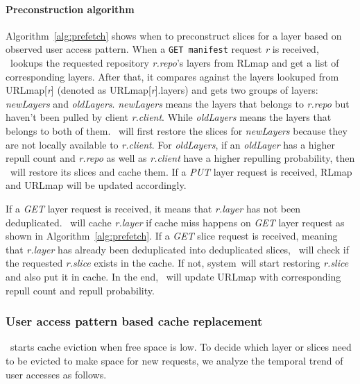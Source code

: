 \paragraph{Preconstruction algorithm}


Algorithm~\ref{alg:prefetch} shows when to preconstruct slices for a layer
based on observed user access pattern.
When a \texttt{GET manifest} request \emph{r} is received,
\preconstructcachename~lookups the requested repository \emph{r.repo}'s layers from RLmap
and get a list of corresponding layers.
After that, it compares against the layers lookuped from URLmap[\emph{r}] (denoted as URLmap[\emph{r}].layers)
and gets two groups of layers: \emph{newLayers} and \emph{oldLayers}.
\emph{newLayers} means the layers that belongs to \emph{r.repo} but haven't been pulled by client \emph{r.client}.
While \emph{oldLayers} means the layers that belongs to both of them.
\preconstructcachename~will first restore the slices for \emph{newLayers} because 
they are not locally available to \emph{r.client}.    
For \emph{oldLayers}, 
if an \emph{oldLayer} has a higher repull count and \emph{r.repo} as well as \emph{r.client} have a higher repulling probability,
then \preconstructcachename~will restore its slices and cache them.
If a \emph{PUT} layer request is received, RLmap and URLmap will be updated accordingly.

If a \emph{GET} layer request is received, it means that \emph{r.layer} has not been deduplicated.
\preconstructcachename~will cache \emph{r.layer} if cache miss happens on \emph{GET} layer request as shown in Algorithm~\ref{alg:prefetch}.
If a \emph{GET} slice request is received, meaning that \emph{r.layer} has already been deduplicated into deduplicated slices,
\preconstructcachename~will check if the requested \emph{r.slice} exists in the cache.
If not,
\dedupname system~will start restoring \emph{r.slice} and also put it in cache.
In the end, \preconstructcachename~will update URLmap with corresponding repull count and repull probability.

\subsubsection{User access pattern  based cache replacement}



\preconstructcachename~starts cache eviction when free space is low.
To decide which layer or slices need to be evicted to make space for new requests,
we analyze the temporal trend of user accesses as follows.

